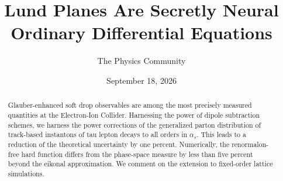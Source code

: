 \documentclass[11pt]{article}
\title{Lund Planes Are Secretly Neural Ordinary Differential Equations}
\author{The Physics Community}
\date{September 18, 2026}
\begin{document}
\maketitle
\begin{abstract}
Glauber-enhanced soft drop observables are among the most precisely
measured quantities at the Electron-Ion Collider. Harnessing the power
of dipole subtraction schemes, we harness the power corrections of the
generalized parton distribution of track-based instantons of tau lepton
decays to all orders in $\alpha_s$. This leads to a reduction of the
theoretical uncertainty by one percent. Numerically, the renormalon-free
hard function differs from the phase-space measure by less than five
percent beyond the eikonal approximation. We comment on the extension to
fixed-order lattice simulations.
\end{abstract}
\tableofcontents






\nocite{*}


\end{document}
